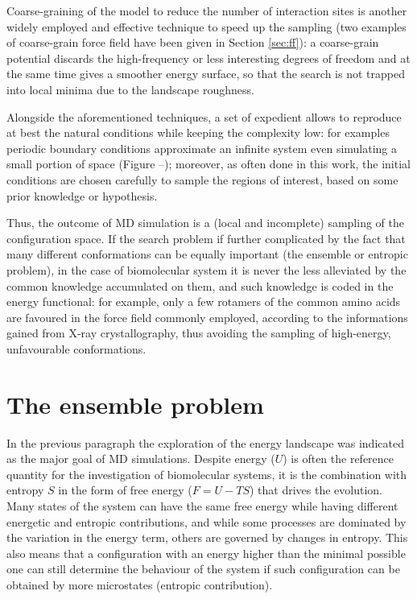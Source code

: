Coarse-graining of the model to reduce the number of interaction sites \cite{54,55,56,57,58,59} is another widely employed and effective technique to speed up the sampling (two examples of coarse-grain force field have been given in Section \ref{sec:ff}): a coarse-grain potential discards the high-frequency or less interesting degrees of freedom and at the same time gives a smoother energy surface, so that the search is not trapped into local minima due to the landscape roughness.

Alongside the aforementioned techniques, a set of expedient allows to reproduce at best the natural conditions while keeping the complexity low:
%
for examples periodic boundary conditions \cite{hh} approximate an infinite system even simulating a small portion of space (Figure --); moreover, as often done in this work, the initial conditions are chosen carefully to sample the regions of interest, based on some prior knowledge or hypothesis.

Thus, the outcome of MD simulation is a (local and incomplete) sampling of the configuration space.
%
If the search problem if further complicated by the fact that many different conformations can be equally important (the ensemble or entropic problem), in the case of biomolecular system it is never the less alleviated by the common knowledge accumulated on them, and such knowledge is coded in the energy functional: for example, only a few rotamers of the common amino acids are favoured in the force field commonly employed, according to the informations gained from X-ray crystallography, thus avoiding the sampling of high-energy, unfavourable conformations.


\section{The ensemble problem}

In the previous paragraph the exploration of the energy landscape was indicated as the major goal of MD simulations. Despite energy ($U$) is often the reference quantity for the investigation of biomolecular systems, it is the combination with entropy $S$ in the form of free energy ($F = U - TS$) that drives the evolution. Many states of the system can have the same free energy while having different energetic and entropic contributions, and while some processes are dominated by the variation in the energy term, others are governed by changes in entropy.
%
This also means that a configuration with an energy higher than the minimal possible one can still determine the behaviour of the system if such configuration can be obtained by more microstates (entropic contribution).

